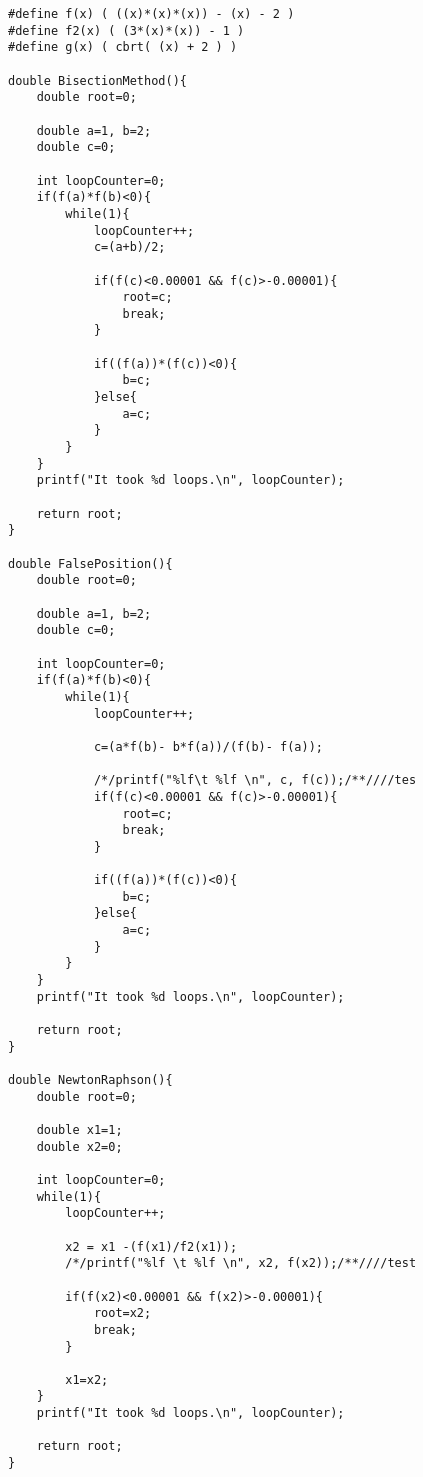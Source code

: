 \begin{tcolorbox}
\begin{verbatim}     
#define f(x) ( ((x)*(x)*(x)) - (x) - 2 )
#define f2(x) ( (3*(x)*(x)) - 1 )
#define g(x) ( cbrt( (x) + 2 ) )

double BisectionMethod(){
    double root=0;
    
    double a=1, b=2;
    double c=0;

    int loopCounter=0;
    if(f(a)*f(b)<0){
        while(1){
            loopCounter++;
            c=(a+b)/2;
            
            if(f(c)<0.00001 && f(c)>-0.00001){
                root=c;
                break;
            }

            if((f(a))*(f(c))<0){
                b=c;
            }else{
                a=c;
            }
        }
    }
    printf("It took %d loops.\n", loopCounter);
    
    return root;
}

double FalsePosition(){
    double root=0;
    
    double a=1, b=2;
    double c=0;
    
    int loopCounter=0;
    if(f(a)*f(b)<0){
        while(1){
            loopCounter++;
            
            c=(a*f(b)- b*f(a))/(f(b)- f(a));
            
            /*/printf("%lf\t %lf \n", c, f(c));/**////tes
            if(f(c)<0.00001 && f(c)>-0.00001){
                root=c;
                break;
            }

            if((f(a))*(f(c))<0){
                b=c;
            }else{
                a=c;
            }
        }
    }
    printf("It took %d loops.\n", loopCounter);
    
    return root;
}

double NewtonRaphson(){
    double root=0;
    
    double x1=1;
    double x2=0;
    
    int loopCounter=0;
    while(1){
        loopCounter++;
        
        x2 = x1 -(f(x1)/f2(x1));
        /*/printf("%lf \t %lf \n", x2, f(x2));/**////test
        
        if(f(x2)<0.00001 && f(x2)>-0.00001){
            root=x2;
            break;
        }
        
        x1=x2;
    }
    printf("It took %d loops.\n", loopCounter);
    
    return root;
}


\end{verbatim}
\end{tcolorbox}
